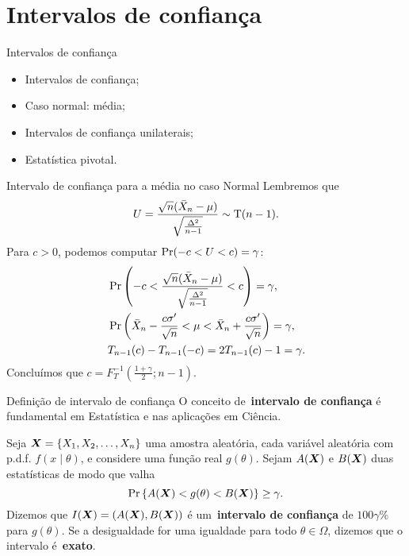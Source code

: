 \section{Intervalos de confiança}
\begin{frame}{Intervalos de confiança}
 \begin{itemize}
  \item Intervalos de confiança;
  \item Caso normal: média;
  \item Intervalos de confiança unilaterais;
  \item Estatística pivotal.  
 \end{itemize}
\end{frame}

\begin{frame}{Intervalo de confiança para a média no caso Normal}
 Lembremos que 
 \begin{equation}
 U = \frac{\sqrt{n}(\bar{X}_n-\mu)}{\sqrt{\frac{\Delta^2}{n-1}}} \sim\operatorname{T}(n-1).
\end{equation}
Para $c>0$, podemos computar $\operatorname{Pr}(-c < U < c) = \gamma$:
\begin{align*}
 &\operatorname{Pr}\left(-c < \frac{\sqrt{n}(\bar{X}_n-\mu)}{\sqrt{\frac{\Delta^2}{n-1}}} < c\right) = \gamma,\\
 &\operatorname{Pr}\left( \bar{X}_n - \frac{c\sigma^\prime}{\sqrt{n}} < \mu <  \bar{X}_n + \frac{c\sigma^\prime}{\sqrt{n}}\right) = \gamma,\\
 &T_{n-1}(c) - T_{n-1}(-c) = 2T_{n-1}(c) - 1 = \gamma.
\end{align*}
Concluímos que $c = F_T^{-1}\left(\frac{1 + \gamma}{2}; n-1\right)$.
\end{frame}

\begin{frame}{Definição de intervalo de confiança}
 O conceito de~\textbf{intervalo de confiança} é fundamental em Estatística e nas aplicações em Ciência.
 \begin{defn}
  Seja $\boldsymbol{X} = \{ X_1, X_2, \ldots, X_n \}$ uma amostra aleatória, cada variável aleatória com p.d.f. $f(x\mid \theta)$, e considere uma função real $g(\theta)$.
  Sejam $A(\boldsymbol{X})$ e $B(\boldsymbol{X})$ duas estatísticas de modo que valha
  \begin{equation}
   \label{eq:confidence_interval}
   \operatorname{Pr}\left\{A(\boldsymbol{X}) < g(\theta) <  B(\boldsymbol{X})\right\} \geq \gamma.
  \end{equation}
Dizemos que $I(\boldsymbol{X}) = (A(\boldsymbol{X}), B(\boldsymbol{X}))$ é um~\textbf{intervalo de confiança} de $100\gamma\%$ para $g(\theta)$.
Se a desigualdade for uma igualdade para todo $\theta \in \Omega$, dizemos que o intervalo é~\textbf{exato}.
 \end{defn}
\end{frame}


